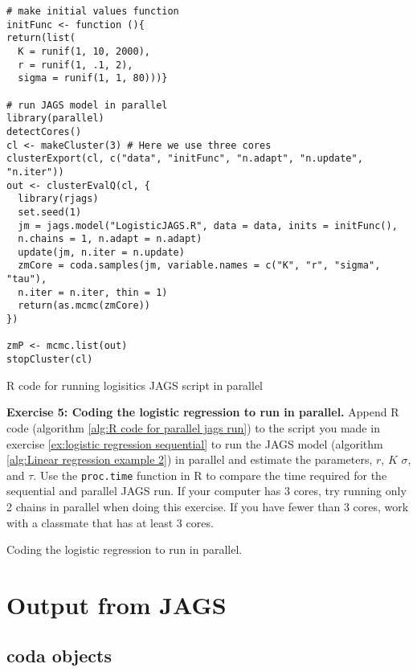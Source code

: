 \documentclass[12pt,english]{article}
\begin{document}
\begin{algorithm}
\begin{Verbatim}[frame=single]
# make initial values function
initFunc <- function (){
return(list(
  K = runif(1, 10, 2000),
  r = runif(1, .1, 2),
  sigma = runif(1, 1, 80)))}

# run JAGS model in parallel
library(parallel)
detectCores()
cl <- makeCluster(3) # Here we use three cores
clusterExport(cl, c("data", "initFunc", "n.adapt", "n.update", "n.iter")) 
out <- clusterEvalQ(cl, {
  library(rjags)
  set.seed(1)
  jm = jags.model("LogisticJAGS.R", data = data, inits = initFunc(), 
  n.chains = 1, n.adapt = n.adapt)
  update(jm, n.iter = n.update)
  zmCore = coda.samples(jm, variable.names = c("K", "r", "sigma", "tau"), 
  n.iter = n.iter, thin = 1)
  return(as.mcmc(zmCore))
}) 

zmP <- mcmc.list(out)
stopCluster(cl)
\end{Verbatim}
\caption{R code for running logisitics JAGS script in parallel}
\label{alg:R code for parallel jags run}
\end{algorithm}

\belowcaptionskip=-40pt
\begin{exercise}
\begin{mdframed}
\doublespacing
\textbf{Exercise 5: Coding the logistic regression to run in parallel.}  Append R code (algorithm \ref{alg:R code for parallel jags run}) to the script you made in exercise \ref{ex:logistic regression sequential} to run the JAGS model (algorithm \ref{alg:Linear regression example 2}) in parallel and estimate the parameters, $r$, $K$ $\sigma$, and $\tau$. Use the \texttt{proc.time} function in R to compare the time required for the sequential and parallel JAGS run. If your computer has 3 cores, try running only 2 chains in parallel when doing this exercise. If you have fewer than 3 cores, work with a classmate that has at least 3 cores.
\end{mdframed}
\captionsetup{textformat=empty, labelformat=empty}
\caption[Coding the logistic regression to run in parallel]{Coding the logistic regression to run in parallel.}
\label{ex:logistic regression parallel}
\end{exercise}
\belowcaptionskip=0pt

\section{Output from JAGS}

\subsection{coda objects}
\end{document}
